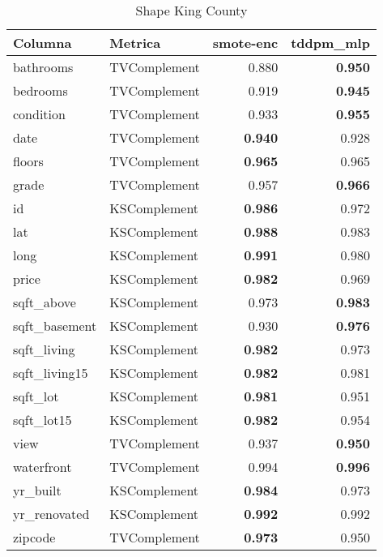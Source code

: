 \begin{table}[H]
\centering
\caption{Shape King County}
\label{table-shape-king county-a-1}
\begin{tabular}{|l|l|r|r|}
\hline
\rowcolor[gray]{0.8}
Columna & Metrica & smote-enc & tddpm\_mlp \\
\hline bathrooms & TVComplement & 0.880 & \bfseries 0.950 \\
\hline bedrooms & TVComplement & 0.919 & \bfseries 0.945 \\
\hline condition & TVComplement & 0.933 & \bfseries 0.955 \\
\hline date & TVComplement & \bfseries 0.940 & 0.928 \\
\hline floors & TVComplement & \bfseries 0.965 & 0.965 \\
\hline grade & TVComplement & 0.957 & \bfseries 0.966 \\
\hline id & KSComplement & \bfseries 0.986 & 0.972 \\
\hline lat & KSComplement & \bfseries 0.988 & 0.983 \\
\hline long & KSComplement & \bfseries 0.991 & 0.980 \\
\hline price & KSComplement & \bfseries 0.982 & 0.969 \\
\hline sqft\_above & KSComplement & 0.973 & \bfseries 0.983 \\
\hline sqft\_basement & KSComplement & 0.930 & \bfseries 0.976 \\
\hline sqft\_living & KSComplement & \bfseries 0.982 & 0.973 \\
\hline sqft\_living15 & KSComplement & \bfseries 0.982 & 0.981 \\
\hline sqft\_lot & KSComplement & \bfseries 0.981 & 0.951 \\
\hline sqft\_lot15 & KSComplement & \bfseries 0.982 & 0.954 \\
\hline view & TVComplement & 0.937 & \bfseries 0.950 \\
\hline waterfront & TVComplement & 0.994 & \bfseries 0.996 \\
\hline yr\_built & KSComplement & \bfseries 0.984 & 0.973 \\
\hline yr\_renovated & KSComplement & \bfseries 0.992 & 0.992 \\
\hline zipcode & TVComplement & \bfseries 0.973 & 0.950 \\
\hline
\end{tabular}
\end{table}
